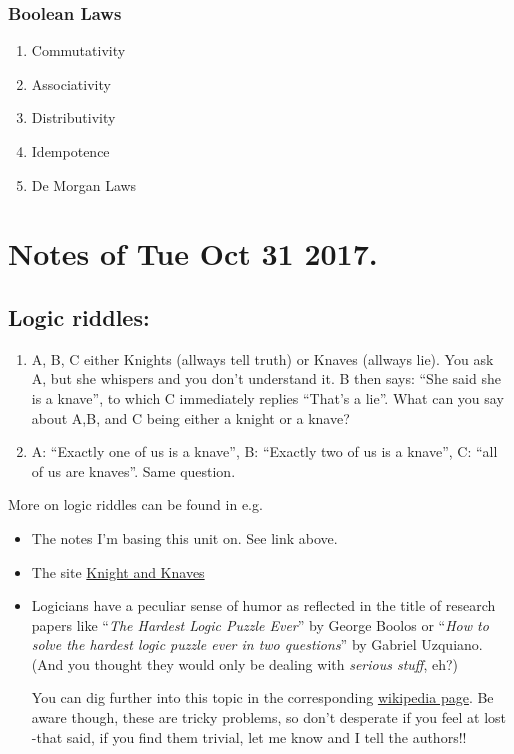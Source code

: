 \subsubsection{Boolean Laws}\label{boolean-laws}

\begin{enumerate}
\def\labelenumi{\arabic{enumi}.}
\tightlist
\item
  Commutativity
\item
  Associativity
\item
  Distributivity
\item
  Idempotence
\item
  De Morgan Laws
\end{enumerate}

\section{Notes of Tue Oct 31 2017.}\label{notes-of-tue-oct-31-2017.}

\subsection{Logic riddles:}\label{logic-riddles}

\begin{enumerate}
\def\labelenumi{\arabic{enumi}.}
\tightlist
\item
  A, B, C either Knights (allways tell truth) or Knaves (allways lie).
  You ask A, but she whispers and you don't understand it. B then says:
  ``She said she is a knave'', to which C immediately replies ``That's a
  lie''. What can you say about A,B, and C being either a knight or a
  knave?
\item
  A: ``Exactly one of us is a knave'', B: ``Exactly two of us is a
  knave'', C: ``all of us are knaves''. Same question.
\end{enumerate}

More on logic riddles can be found in e.g.

\begin{itemize}
\item
  The notes I'm basing this unit on. See link above.
\item
  The site
  \href{https://sites.google.com/site/newheiser/knightsandknaves}{Knight
  and Knaves}
\item
  Logicians have a peculiar sense of humor as reflected in the title of
  research papers like ``\emph{The Hardest Logic Puzzle Ever}'' by
  George Boolos or ``\emph{How to solve the hardest logic puzzle ever in
  two questions}'' by Gabriel Uzquiano. (And you thought they would only
  be dealing with \emph{serious stuff}, eh?)

  You can dig further into this topic in the corresponding
  \href{https://en.wikipedia.org/wiki/The_Hardest_Logic_Puzzle_Ever}{wikipedia
  page}. Be aware though, these are tricky problems, so don't desperate
  if you feel at lost -that said, if you find them trivial, let me know
  and I tell the authors!!
\end{itemize}

